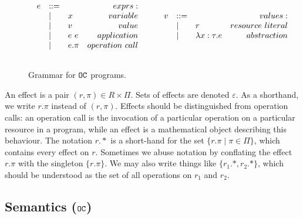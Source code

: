 \begin{figure}[h]
\vspace{-5pt}

\[
\begin{array}{lll}

\begin{array}{lllr}

e & ::= & ~ & exprs: \\
	& | & x & variable \\
	& | & v & value \\
	& | & e ~ e & application \\
	& | & e.\pi & operation~call \\
	&&\\

\end{array}

	\hspace{5ex}

\begin{array}{lllr}

v & ::= & ~ & values: \\ 
	& | & r & resource~literal \\
	& | & \lambda x: \tau.e & abstraction \\
	&&\\

\end{array}

\end{array}
\]

\vspace{-7pt}
\caption{Grammar for $\mathtt{OC}$ programs.}
\label{fig:opercalc_grammar}
\end{figure}

An effect is a pair $(r, \pi) \in R \times \Pi$. Sets of effects are denoted $\varepsilon$. As a shorthand, we write $r.\pi$ instead of $(r, \pi)$. Effects should be distinguished from operation calls: an operation call is the invocation of a particular operation on a particular resource in a program, while an effect is a mathematical object describing this behaviour. The notation $r.*$ is a short-hand for the set $\{ r.\pi \mid \pi \in \Pi \}$, which contains every effect on $r$. Sometimes we abuse notation by conflating the effect $r.\pi$ with the singleton $\{ r.\pi \}$. We may also write things like $\{ r_1.*, r_2.* \}$, which should be understood as the set of all operations on $r_1$ and $r_2$.

\subsection{Semantics ($\mathtt{OC}$)}

